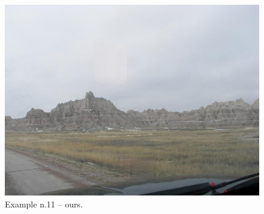 \documentclass[a4paper, 11pt]{article}
\begin{document}
\begin{figure}
    \centering
    \includegraphics[width=.95\linewidth]{documentation/img/modified/0185.png}
    \caption{Example n.11 -- ours.}
    \label{img:ex_n.11_mask}
\end{figure}
\end{document}
